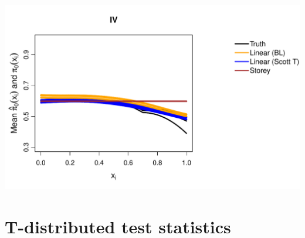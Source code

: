 \documentclass{article}\usepackage[]{graphicx}\usepackage[]{color}
\makeatletter
\def\maxwidth{ %
  \ifdim\Gin@nat@width>\linewidth
    \linewidth
  \else
    \Gin@nat@width
  \fi
}
\newenvironment{knitrout}{}{} %
\makeatother
\begin{document}
\begin{knitrout}
{\includegraphics[width=\maxwidth]{Figures/plot_of_mean_estimates_norm_10000-7} 

}



\end{knitrout}

\section{T-distributed test statistics}
\end{document}
